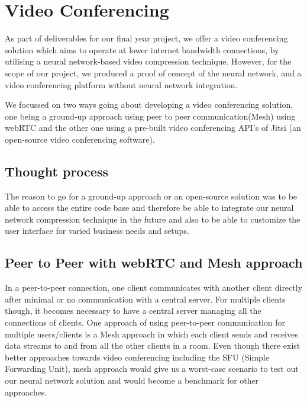 \section{Video Conferencing}
As part of deliverables for our final year project, we offer a video conferencing solution which aims to operate at 
lower internet bandwidth connections, by utilising a neural network-based video compression technique. 
However, for the scope of our project, we produced a proof of concept of the neural network, and a video 
conferencing platform without neural network integration.

We focussed on two ways going about developing a video conferencing solution, one being a ground-up approach using peer 
to peer communication(Mesh) using webRTC and the other one using a pre-built video conferencing API’s of Jitsi 
(an open-source video conferencing software).

\subsection{Thought process}

The reason to go for a ground-up approach or an open-source solution was to be able to access the entire code 
base and therefore be able to integrate our neural network compression technique in the future and also to be able to
customize the user interface for varied business needs and setups.

\subsection{ Peer to Peer with webRTC and Mesh approach}
In a peer-to-peer connection, one client communicates with another client directly after minimal or no communication with a central server.
For multiple clients though, it becomes necessary to have a central server managing all the connections of clients.
One approach of using peer-to-peer communication for multiple users/clients is a Mesh approach in which each client sends and receives data streams to and from all the other clients in a room.
Even though there exist better approaches towards video conferencing including the SFU (Simple Forwarding Unit), 
mesh approach would give us a worst-case scenario to test out our neural network solution and would become a benchmark for other approaches.

